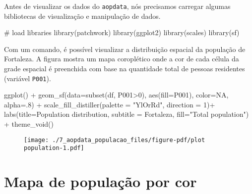 \documentclass[
  letterpaper,
  DIV=11,
  numbers=noendperiod]{scrreprt}
\newenvironment{Shaded}{\begin{snugshade}}{\end{snugshade}}
\newcommand{\AttributeTok}[1]{\textcolor[rgb]{0.40,0.45,0.13}{#1}}
\newcommand{\CommentTok}[1]{\textcolor[rgb]{0.37,0.37,0.37}{#1}}
\newcommand{\ConstantTok}[1]{\textcolor[rgb]{0.56,0.35,0.01}{#1}}
\newcommand{\DecValTok}[1]{\textcolor[rgb]{0.68,0.00,0.00}{#1}}
\newcommand{\FunctionTok}[1]{\textcolor[rgb]{0.28,0.35,0.67}{#1}}
\newcommand{\NormalTok}[1]{\textcolor[rgb]{0.00,0.23,0.31}{#1}}
\newcommand{\SpecialCharTok}[1]{\textcolor[rgb]{0.37,0.37,0.37}{#1}}
\newcommand{\StringTok}[1]{\textcolor[rgb]{0.13,0.47,0.30}{#1}}
\begin{document}
Antes de visualizar os dados do \texttt{aopdata}, nós precisamos
carregar algumas bibliotecas de visualização e manipulação de dados.

\begin{Shaded}
\begin{Highlighting}[]
\CommentTok{\# load libraries}
\FunctionTok{library}\NormalTok{(patchwork)}
\FunctionTok{library}\NormalTok{(ggplot2)}
\FunctionTok{library}\NormalTok{(scales)}
\FunctionTok{library}\NormalTok{(sf)}
\end{Highlighting}
\end{Shaded}

Com um comando, é possível visualizar a distribuição espacial da
população de Fortaleza. A figura mostra um mapa coroplético onde a cor
de cada célula da grade espacial é preenchida com base na quantidade
total de pessoas residentes (variável \texttt{P001}).

\begin{Shaded}
\begin{Highlighting}[]
\FunctionTok{ggplot}\NormalTok{() }\SpecialCharTok{+}
  \FunctionTok{geom\_sf}\NormalTok{(}\AttributeTok{data=}\FunctionTok{subset}\NormalTok{(df, P001}\SpecialCharTok{\textgreater{}}\DecValTok{0}\NormalTok{), }\FunctionTok{aes}\NormalTok{(}\AttributeTok{fill=}\NormalTok{P001), }\AttributeTok{color=}\ConstantTok{NA}\NormalTok{, }\AttributeTok{alpha=}\NormalTok{.}\DecValTok{8}\NormalTok{) }\SpecialCharTok{+}
  \FunctionTok{scale\_fill\_distiller}\NormalTok{(}\AttributeTok{palette =} \StringTok{"YlOrRd"}\NormalTok{, }\AttributeTok{direction =} \DecValTok{1}\NormalTok{)}\SpecialCharTok{+}
  \FunctionTok{labs}\NormalTok{(}\AttributeTok{title=}\StringTok{\textquotesingle{}Population distribution\textquotesingle{}}\NormalTok{, }
       \AttributeTok{subtitle =} \StringTok{\textquotesingle{}Fortaleza\textquotesingle{}}\NormalTok{, }\AttributeTok{fill=}\StringTok{"Total population"}\NormalTok{) }\SpecialCharTok{+}
  \FunctionTok{theme\_void}\NormalTok{()}
\end{Highlighting}
\end{Shaded}

\begin{figure}[H]

{\centering \texttt{[image: ./7\_aopdata\_populacao\_files/figure-pdf/plot population-1.pdf]}

}

\end{figure}

\hypertarget{mapa-de-populauxe7uxe3o-por-cor}{%
\section{Mapa de população por
cor}\label{mapa-de-populauxe7uxe3o-por-cor}}
\end{document}
